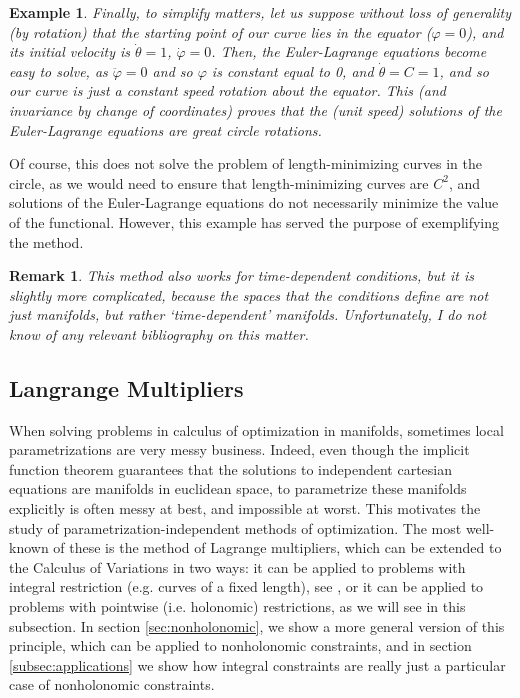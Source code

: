 \documentclass{article}
\theoremstyle{plain}
\theoremstyle{plain}
\newtheorem{remark}{Remark}
\newtheorem{example}{Example}
\theoremstyle{nonumberplain}
\theoremstyle{empty}
\begin{document}
\begin{example}
Finally, to simplify matters, let us suppose without loss of generality (by rotation) that the starting point of our curve lies in the equator ($\varphi = 0$), and its initial velocity is $\dot\theta = 1$, $\dot \varphi = 0$. Then, the Euler-Lagrange equations become easy to solve, as $\ddot \varphi = 0$ and so $\varphi$ is constant equal to 0, and $\dot \theta = C = 1$, and so our curve is just a constant speed rotation about the equator. This (and invariance by change of coordinates) proves that the (unit speed) solutions of the Euler-Lagrange equations are great circle rotations.
\end{example}

Of course, this does not solve the problem of length-minimizing curves in the circle, as we would need to ensure that length-minimizing curves are $C^2$, and solutions of the Euler-Lagrange equations do not necessarily minimize the value of the functional. However, this example has served the purpose of exemplifying the method.

\begin{remark}
This method also works for time-dependent conditions, but it is slightly more complicated, because the spaces that the conditions define are not just manifolds, but rather `time-dependent' manifolds. Unfortunately, I do not know of any relevant bibliography on this matter.
\end{remark}

\subsection{Langrange Multipliers}

When solving problems in calculus of optimization in manifolds, sometimes local parametrizations are very messy business. Indeed, even though the implicit function theorem guarantees that the solutions to independent cartesian equations are manifolds in euclidean space, to parametrize these manifolds explicitly is often messy at best, and impossible at worst. This motivates the study of parametrization-independent methods of optimization. The most well-known of these is the method of Lagrange multipliers, which can be extended to the Calculus of Variations in two ways: it can be applied to problems with integral restriction (e.g. curves of a fixed length), see \cite[\S 12.1]{gelfandfomin}, or it can be applied to problems with pointwise (i.e. holonomic) restrictions, as we will see in this subsection. In section \ref{sec:nonholonomic}, we show a more general version of this principle, which can be applied to nonholonomic constraints, and in section \ref{subsec:applications} we show how integral constraints are really just a particular case of nonholonomic constraints. %
\end{document}
